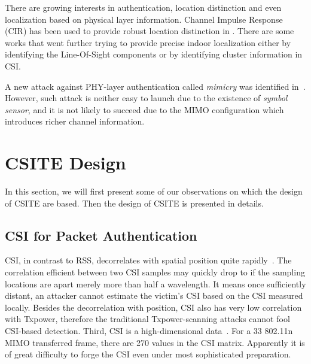 \documentclass[conference]{IEEEtran}
\begin{document}
There are growing interests in authentication, location distinction and
even localization based on physical layer information. Channel
Impulse Response (CIR) has been used to provide robust location
distinction in \cite{patwari2007robust,zhang2008advancing}. There are some works
\cite{sen2012spinloc,wu2012fila,sen2012spot} that went further trying to
provide precise indoor localization either by identifying the
Line-Of-Sight components or by identifying cluster information in
CSI.

A new attack against PHY-layer authentication called \textit{mimicry} was identified
in~\cite{liu12enhanced}. However, such attack is neither easy
to launch due to the existence of \textit{symbol sensor}, and it is not likely to
succeed due to the MIMO configuration which introduces richer channel
information.



\section{CSITE Design}
\label{sec:design}

In this section, we will first present some of our observations on
 which the design of CSITE are based. Then the design of CSITE is
 presented in details.

\subsection{CSI for Packet Authentication}
 CSI, in contrast to RSS, decorrelates with spatial position quite rapidly~\cite{WCbook}. The correlation efficient  between two CSI samples may quickly drop to  if the sampling locations are apart merely more than half a wavelength. It means once sufficiently distant, an attacker cannot estimate the victim's CSI based on the CSI measured locally.
Besides the decorrelation with position, CSI also has very low correlation with Txpower, therefore the traditional Txpower-scanning attacks cannot fool CSI-based detection.
 Third, CSI is a high-dimensional data~\cite{ieee2009ieee}. For a 33 802.11n MIMO transferred frame, there are 270 values in the CSI matrix. Apparently it is of great difficulty to forge the CSI even
 under most sophisticated preparation.
\end{document}
